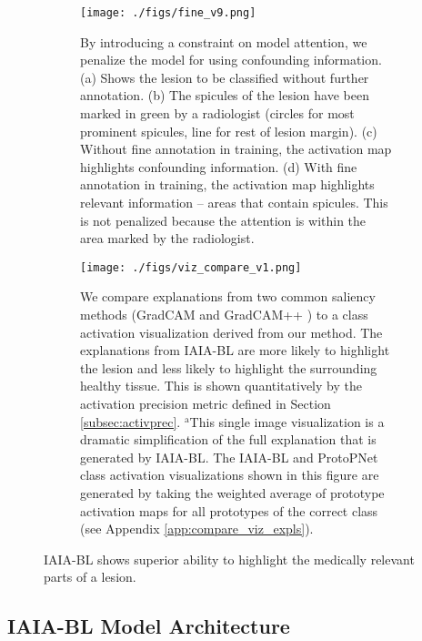 \documentclass[11pt]{article}
\begin{document}
\begin{figure}
    \centering
        \begin{subfigure}{\textwidth}
        \centering
        \texttt{[image: ./figs/fine\_v9.png]}
        \caption{By introducing a constraint on model attention, we penalize the model for using confounding information. (a) Shows the lesion to be classified without further annotation. (b) The spicules of the lesion have been marked in green by a radiologist (circles for most prominent spicules, line for rest of lesion margin). (c) Without fine annotation in training, the activation map highlights confounding information. (d) With fine annotation in training, the activation map highlights relevant information -- areas that contain spicules. This is not penalized because the attention is within the area marked by the radiologist.} \label{fig:fine_attention}
        \end{subfigure}
        
        \begin{subfigure}{\textwidth}
        \centering
        \texttt{[image: ./figs/viz\_compare\_v1.png]}
        \caption{We compare explanations from two common saliency methods (GradCAM \cite{Selvaraju_2017_ICCV} and GradCAM++ \cite{chattopadhay2018grad}) to a class activation visualization derived from our method. The explanations from IAIA-BL are more likely to highlight the lesion and less likely to highlight the surrounding healthy tissue. This is shown quantitatively by the activation precision metric defined in Section \ref{subsec:activprec}. $^{\text{a}}$This single image visualization is a dramatic simplification of the full explanation that is generated by IAIA-BL. The IAIA-BL and ProtoPNet class activation visualizations shown in this figure are generated by taking the weighted average of prototype activation maps for all prototypes of the correct class (see Appendix \ref{app:compare_viz_expls}).} \label{fig:compare_gradcam_viz_to_us}
        \end{subfigure}
    \caption{IAIA-BL shows superior ability to highlight the medically relevant parts of a lesion.}
    \label{fig:fine_and_vis_compare}
\end{figure}

\subsection{IAIA-BL Model Architecture}
\end{document}
